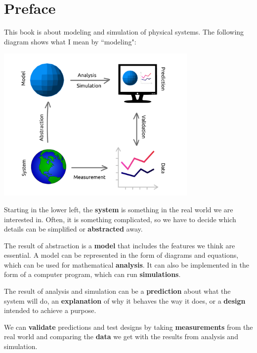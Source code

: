 \documentclass[12pt]{book}
\theoremstyle{exercise}
\begin{document}
\fi

\chapter{Preface}
\label{preface}

This book is about modeling and simulation of physical systems.  
The following diagram shows what I mean by ``modeling":

\vspace{0.2in}
\centerline{\includegraphics[height=3in]{figs/modeling_framework.pdf}}

Starting in the lower left, the {\bf system} is something in the real world we are interested in.  Often, it is something complicated, so we have to decide which details can be simplified or {\bf abstracted} away.

The result of abstraction is a {\bf model} that includes the features we think are essential.  A model can be represented in the form of diagrams and equations, which can be used for mathematical {\bf analysis}.  It can also be implemented in the form of a computer program, which can run {\bf simulations}.

The result of analysis and simulation can be a {\bf prediction} about what the system will do, an {\bf explanation} of why it behaves the way it does, or a {\bf design} intended to achieve a purpose.

We can {\bf validate} predictions and test designs by taking {\bf measurements} from the real world and comparing the {\bf data} we get with the results from analysis and simulation. 
\end{document}
